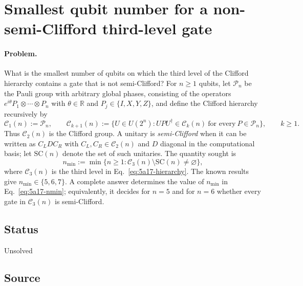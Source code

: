 \section{Smallest qubit number for a non-semi-Clifford third-level gate}
\label{sec:op_5a17b19b8adeb191}

\paragraph{Problem.}
What is the smallest number of qubits on which the third level of the
Clifford hierarchy contains a gate that is not semi-Clifford?  For $n\geq1$
qubits, let $\mathcal{P}_n$ be the Pauli group with arbitrary global phases,
consisting of the operators $e^{i\theta}P_1\otimes\cdots\otimes P_n$ with
$\theta\in\mathbb{R}$ and $P_j\in\{I,X,Y,Z\}$, and define the Clifford
hierarchy recursively by
\begin{equation}
  \mathcal{C}_1(n):=\mathcal{P}_n,
  \qquad
  \mathcal{C}_{k+1}(n):=
  \bigl\{U\in U(2^n):UPU^\dagger\in\mathcal{C}_k(n)
  \ \text{for every}\ P\in\mathcal{P}_n\bigr\},
  \qquad k\geq1.
  \label{eq:5a17-hierarchy}
\end{equation}
Thus $\mathcal{C}_2(n)$ is the Clifford group.  A unitary is \emph{semi-Clifford}
when it can be written as $C_LDC_R$ with $C_L,C_R\in\mathcal{C}_2(n)$ and $D$
diagonal in the computational basis; let $\mathrm{SC}(n)$ denote the set of such
unitaries.  The quantity sought is
\begin{equation}
  n_{\min}:=\min\bigl\{n\geq1:
  \mathcal{C}_3(n)\setminus\mathrm{SC}(n)\neq\varnothing\bigr\},
  \label{eq:5a17-nmin}
\end{equation}
where $\mathcal{C}_3(n)$ is the third level in Eq.~\eqref{eq:5a17-hierarchy}.
The known results give $n_{\min}\in\{5,6,7\}$.  A complete answer determines
the value of $n_{\min}$ in Eq.~\eqref{eq:5a17-nmin}; equivalently, it decides
for $n=5$ and for $n=6$ whether every gate in $\mathcal{C}_3(n)$ is
semi-Clifford.

\subsection*{Status}

Unsolved

\subsection*{Source}

